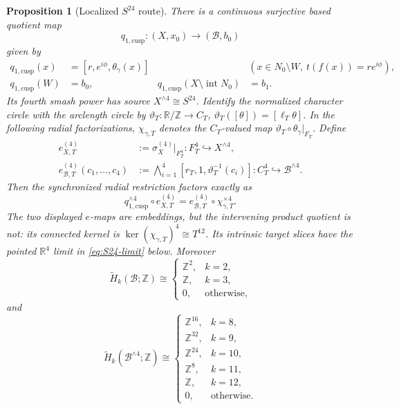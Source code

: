 \documentclass[11pt,letterpaper]{article}
\numberwithin{equation}{section}
\newtheorem{proposition}[theorem]{Proposition}
\theoremstyle{definition}
\theoremstyle{remark}
\newcommand{\R}{\mathbb R}
\newcommand{\Z}{\mathbb Z}
\begin{document}
\begin{proposition}[Localized $S^{24}$ route]
\label{prop:S24-local}
There is a continuous surjective based quotient map
\begin{equation}
 q_{1,\mathrm{cusp}}:(X,x_0)\longrightarrow(\mathcal B,b_0)
 \label{eq:q1-cusp}
\end{equation}
given by
\begin{equation}
 \begin{aligned}
 q_{1,\mathrm{cusp}}(x)&=[r,e^{i\phi},\theta_\gamma(x)]
 &&(x\in N_0\setminus W,\ t(f(x))=re^{i\phi}),\\
 q_{1,\mathrm{cusp}}(W)&=b_0,
 &q_{1,\mathrm{cusp}}(X\setminus\operatorname{int}N_0)&=b_1.
 \end{aligned}
 \label{eq:q1-local-formula}
\end{equation}
Its fourth smash power has source
$X^{\wedge4}\cong S^{24}$.  Identify the normalized character circle with
the arclength circle by
\(\vartheta_T:\R/\Z\to C_T\),
\(\vartheta_T([\theta])=[\ell_T\theta]\).  In the following radial
factorizations, \(\chi_{\gamma,T}\) denotes the \(C_T\)-valued map
\(\vartheta_T\circ\theta_\gamma|_{F_T}\).  Define
\begin{align*}
 e_{X,T}^{(4)}&:=\sigma_X^{(4)}|_{F_T^4}:F_T^4\hookrightarrow X^{\wedge4},\\
 e_{\mathcal B,T}^{(4)}(c_1,\ldots,c_4)
 &:=\bigwedge_{i=1}^4
 [r_T,1,\vartheta_T^{-1}(c_i)]:
 C_T^4\hookrightarrow\mathcal B^{\wedge4}.
\end{align*}
Then the synchronized radial restriction factors exactly as
\begin{equation}
 q_{1,\mathrm{cusp}}^{\wedge4}\circ e_{X,T}^{(4)}
 =e_{\mathcal B,T}^{(4)}\circ\chi_{\gamma,T}^{\times4}.
 \label{eq:q1-cusp-fibre}
\end{equation}
The two displayed \(e\)-maps are embeddings, but the intervening product
quotient is not: its connected kernel is
\(\ker(\chi_{\gamma,T})^4\cong T^{12}\).
Its intrinsic target slices have the pointed $\R^4$ limit in
\cref{eq:S24-limit} below.  Moreover
\begin{equation}
 \widetilde H_k(\mathcal B;\Z)\cong
 \begin{cases}\Z^2,&k=2,\\\Z,&k=3,\\0,&\text{otherwise},\end{cases}
 \label{eq:B-homology}
\end{equation}
and
\begin{equation}
 \widetilde H_k(\mathcal B^{\wedge4};\Z)\cong
 \begin{cases}
 \Z^{16},&k=8,\\
 \Z^{32},&k=9,\\
 \Z^{24},&k=10,\\
 \Z^8,&k=11,\\
 \Z,&k=12,\\
 0,&\text{otherwise}.
 \end{cases}
 \label{eq:B-smash-homology}
\end{equation}
\end{proposition}
\end{document}
